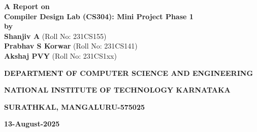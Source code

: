 \documentclass[12pt]{article}
\newlength{\defbaselineskip}
\newcommand{\setlinespacing}[1]{\setlength{\baselineskip}{#1 \defbaselineskip}}
\begin{document}
\begin{titlepage}
\setlinespacing{2}
\thispagestyle{empty}

\begin{center}
{\fontsize{22}{26.4}\textbf{A Report on\\ Compiler Design Lab (CS304): Mini Project Phase 1}}\\


\textbf{by}\\
{\textbf{Shanjiv A}} (Roll No: 231CS155)\\
\vspace{0.5cm}
{\textbf{Prabhav S Korwar}} (Roll No: 231CS141)\\
\vspace{0.5cm}
{\textbf{Akshaj PVY}} (Roll No: 231CS1xx)\\


\vspace{0.3cm}
\begin{figure}[h] 
{\par}
\end{figure} 

\setlinespacing{2}
\vspace{0.3cm}



{\textbf{DEPARTMENT OF COMPUTER SCIENCE AND ENGINEERING}\par}
\vspace{-12pt}
{\textbf{NATIONAL INSTITUTE OF TECHNOLOGY KARNATAKA}\par}
\vspace{-12pt}
{\textbf{SURATHKAL, MANGALURU-575025}\par}
\vspace{-12pt}
{\textbf{13-August-2025}\par}



\end{center}
\pagebreak
\end{titlepage}
\end{document}
